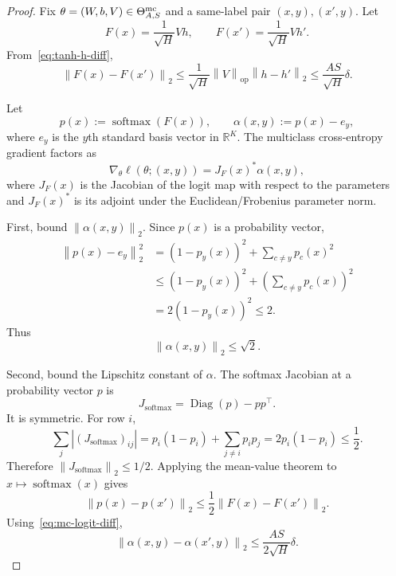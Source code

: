 \documentclass[conference,compsoc]{IEEEtran}
\DeclareMathOperator{\softmax}{softmax}
\DeclareMathOperator{\Diag}{Diag}
\newcommand{\R}{\mathbb{R}}
\newcommand{\op}{\mathrm{op}}
\newcommand{\norm}[1]{\left\lVert #1\right\rVert}
\begin{document}
\begin{proof}
Fix $\theta=(W,b,V)\in\Theta_{A,S}^{\rm mc}$ and a same-label pair
$(x,y),(x',y)$.  Let
\[
F(x)=\frac1{\sqrt H}Vh,
\qquad
F(x')=\frac1{\sqrt H}Vh'.
\]
From~\eqref{eq:tanh-h-diff},
\begin{equation}
\label{eq:mc-logit-diff}
\norm{F(x)-F(x')}_2
\le
\frac1{\sqrt H}\norm{V}_{\op}\norm{h-h'}_2
\le
\frac{AS}{\sqrt H}\delta.
\end{equation}

Let
\[
p(x):=\softmax(F(x)),
\qquad
\alpha(x,y):=p(x)-e_y,
\]
where $e_y$ is the $y$th standard basis vector in $\R^K$.  The multiclass
cross-entropy gradient factors as
\begin{equation}
\label{eq:mc-gradient-factorization}
\nabla_\theta\ell(\theta;(x,y))
=
J_F(x)^\ast\alpha(x,y),
\end{equation}
where $J_F(x)$ is the Jacobian of the logit map with respect to the parameters
and $J_F(x)^\ast$ is its adjoint under the Euclidean/Frobenius parameter norm.

First, bound $\norm{\alpha(x,y)}_2$.  Since $p(x)$ is a probability vector,
\begin{align*}
\norm{p(x)-e_y}_2^2
&=(1-p_y(x))^2+
\sum_{c\ne y}p_c(x)^2\\
&\le
(1-p_y(x))^2+
\left(\sum_{c\ne y}p_c(x)\right)^2\\
&=2(1-p_y(x))^2
\le2.
\end{align*}
Thus
\begin{equation}
\label{eq:alpha-norm-bound}
\norm{\alpha(x,y)}_2\le\sqrt2.
\end{equation}

Second, bound the Lipschitz constant of $\alpha$.  The softmax Jacobian at a
probability vector $p$ is
\[
J_{\softmax}=\Diag(p)-pp^\top.
\]
It is symmetric.  For row $i$,
\[
\sum_j |(J_{\softmax})_{ij}|
=p_i(1-p_i)+\sum_{j\ne i}p_ip_j
=2p_i(1-p_i)
\le\frac12.
\]
Therefore $\norm{J_{\softmax}}_2\le1/2$.  Applying the mean-value theorem to
$x\mapsto\softmax(x)$ gives
\[
\norm{p(x)-p(x')}_2
\le
\frac12\norm{F(x)-F(x')}_2.
\]
Using~\eqref{eq:mc-logit-diff},
\begin{equation}
\label{eq:alpha-lipschitz}
\norm{\alpha(x,y)-\alpha(x',y)}_2
\le
\frac{AS}{2\sqrt H}\delta.
\end{equation}


\end{proof}
\end{document}
